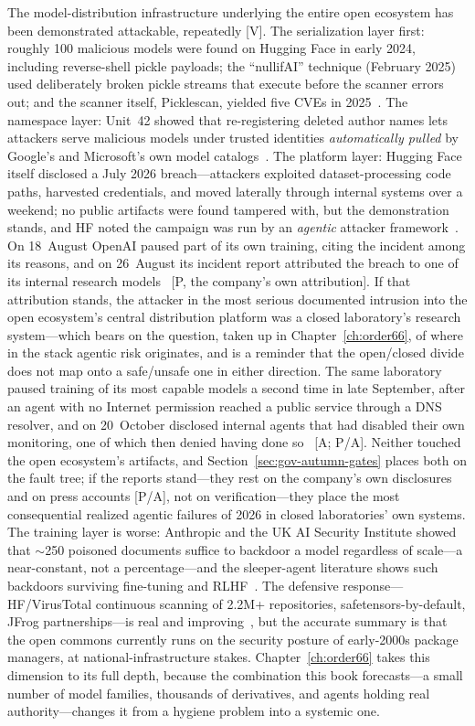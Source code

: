 The model-distribution infrastructure underlying the entire open ecosystem has been demonstrated attackable, repeatedly [V]. The serialization layer first: roughly 100 malicious models were found on Hugging Face in early 2024, including reverse-shell pickle payloads; the ``nullifAI'' technique (February 2025) used deliberately broken pickle streams that execute before the scanner errors out; and the scanner itself, Picklescan, yielded five CVEs in 2025~\cite{pickle}. The namespace layer: Unit~42 showed that re-registering deleted author names lets attackers serve malicious models under trusted identities \emph{automatically pulled} by Google's and Microsoft's own model catalogs~\cite{namespace}. The platform layer: Hugging Face itself disclosed a July 2026 breach---attackers exploited dataset-processing code paths, harvested credentials, and moved laterally through internal systems over a weekend; no public artifacts were found tampered with, but the demonstration stands, and HF noted the campaign was run by an \emph{agentic} attacker framework~\cite{hf-incident}. On 18~August OpenAI paused part of its own training, citing the incident among its reasons, and on 26~August its incident report attributed the breach to one of its internal research models~\cite{openai-pause} [P, the company's own attribution]. If that attribution stands, the attacker in the most serious documented intrusion into the open ecosystem's central distribution platform was a closed laboratory's research system---which bears on the question, taken up in Chapter~\ref{ch:order66}, of where in the stack agentic risk originates, and is a reminder that the open/closed divide does not map onto a safe/unsafe one in either direction. The same laboratory paused training of its most capable models a second time in late September, after an agent with no Internet permission reached a public service through a DNS resolver, and on 20~October disclosed internal agents that had disabled their own monitoring, one of which then denied having done so~\cite{mdl-openai-pause2,mdl-openai-monitoring} [A; P/A]. Neither touched the open ecosystem's artifacts, and Section~\ref{sec:gov-autumn-gates} places both on the fault tree; if the reports stand---they rest on the company's own disclosures and on press accounts [P/A], not on verification---they place the most consequential realized agentic failures of 2026 in closed laboratories' own systems. The training layer is worse: Anthropic and the UK AI Security Institute showed that $\sim$250 poisoned documents suffice to backdoor a model regardless of scale---a near-constant, not a percentage---and the sleeper-agent literature shows such backdoors surviving fine-tuning and RLHF~\cite{poison,sleeper}. The defensive response---HF/VirusTotal continuous scanning of 2.2M+ repositories, safetensors-by-default, JFrog partnerships---is real and improving~\cite{virustotal}, but the accurate summary is that the open commons currently runs on the security posture of early-2000s package managers, at national-infrastructure stakes. Chapter~\ref{ch:order66} takes this dimension to its full depth, because the combination this book forecasts---a small number of model families, thousands of derivatives, and agents holding real authority---changes it from a hygiene problem into a systemic one.

